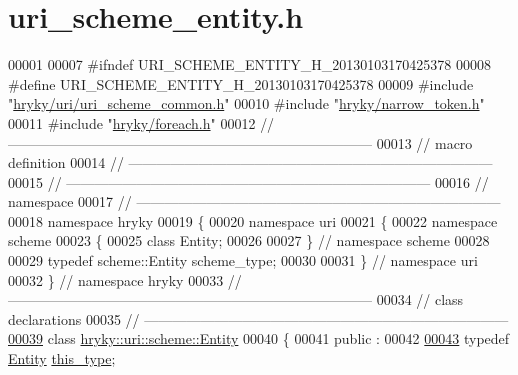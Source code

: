 \hypertarget{uri__scheme__entity_8h_source}{\section{uri\-\_\-scheme\-\_\-entity.\-h}
}

\begin{DoxyCode}
00001 
00007 \textcolor{preprocessor}{#ifndef URI\_SCHEME\_ENTITY\_H\_20130103170425378}
00008 \textcolor{preprocessor}{}\textcolor{preprocessor}{#define URI\_SCHEME\_ENTITY\_H\_20130103170425378}
00009 \textcolor{preprocessor}{}\textcolor{preprocessor}{#include "\hyperlink{uri__scheme__common_8h}{hryky/uri/uri_scheme_common.h}"}
00010 \textcolor{preprocessor}{#include "\hyperlink{narrow__token_8h}{hryky/narrow_token.h}"}
00011 \textcolor{preprocessor}{#include "\hyperlink{foreach_8h}{hryky/foreach.h}"}
00012 \textcolor{comment}{//
      ------------------------------------------------------------------------------}
00013 \textcolor{comment}{// macro definition}
00014 \textcolor{comment}{//
      ------------------------------------------------------------------------------}
00015 \textcolor{comment}{//
      ------------------------------------------------------------------------------}
00016 \textcolor{comment}{// namespace}
00017 \textcolor{comment}{//
      ------------------------------------------------------------------------------}
00018 \textcolor{keyword}{namespace }hryky
00019 \{
00020 \textcolor{keyword}{namespace }uri
00021 \{
00022 \textcolor{keyword}{namespace }scheme
00023 \{
00025     \textcolor{keyword}{class }Entity;
00026 
00027 \} \textcolor{comment}{// namespace scheme}
00028 
00029 \textcolor{keyword}{typedef} scheme::Entity scheme\_type;
00030 
00031 \} \textcolor{comment}{// namespace uri}
00032 \} \textcolor{comment}{// namespace hryky}
00033 \textcolor{comment}{//
      ------------------------------------------------------------------------------}
00034 \textcolor{comment}{// class declarations}
00035 \textcolor{comment}{//
      ------------------------------------------------------------------------------}
\hypertarget{uri__scheme__entity_8h_source_l00039}{}\hyperlink{classhryky_1_1uri_1_1scheme_1_1_entity}{00039} \textcolor{comment}{}\textcolor{keyword}{class }\hyperlink{classhryky_1_1uri_1_1scheme_1_1_entity}{hryky::uri::scheme::Entity}
00040 \{
00041 \textcolor{keyword}{public} :
00042 
\hypertarget{uri__scheme__entity_8h_source_l00043}{}\hyperlink{classhryky_1_1uri_1_1scheme_1_1_entity_aa2f5c1de6e49bee58c948b3534811e03}{00043}     \textcolor{keyword}{typedef} \hyperlink{classhryky_1_1uri_1_1scheme_1_1_entity}{Entity} \hyperlink{classhryky_1_1uri_1_1scheme_1_1_entity_aa2f5c1de6e49bee58c948b3534811e03}{this_type};

\end{DoxyCode}
